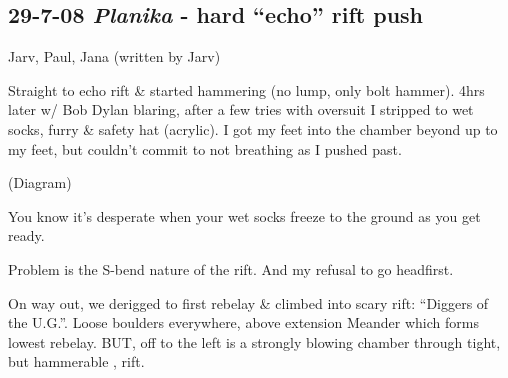 \subsection{\texorpdfstring{29-7-08 \emph{Planika} - hard ``echo'' rift
push}{29-7-08 Planika - hard ``echo'' rift push}}

Jarv, Paul, Jana (written by Jarv)

Straight to echo rift \& started hammering (no lump, only bolt hammer).
4hrs later w/ Bob Dylan blaring, after a few tries with oversuit I
stripped to wet socks, furry \& safety hat (acrylic). I got my feet into
the chamber beyond up to my feet, but couldn't commit to not breathing
as I pushed past.

(Diagram)

You know it's desperate when your wet socks freeze to the ground as you
get ready.

Problem is the S-bend nature of the rift. And my refusal to go
headfirst.

On way out, we derigged to first rebelay \& climbed into scary rift:
``Diggers of the U.G.''. Loose boulders everywhere, above extension
Meander which forms lowest rebelay. BUT, off to the left is a strongly
blowing chamber through tight, but hammerable , rift.
